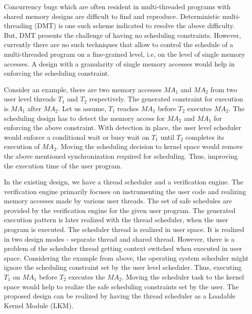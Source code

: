 Concurrency bugs which are often resident in multi-threaded programs with shared memory designs are difficult to find and reproduce. 
Deterministic multi-threading (DMT) is one such scheme indicated to resolve the above difficulty. 
But, DMT presents the challenge of having no scheduling constraints.  
However, currently there are no such techniques that allow to control the schedule of a multi-threaded program on a fine-grained level, i.e, on the level of single memory accesses. 
A design with a granularity of single memory accesses would help in enforcing the scheduling constraint. 

Consider an example, there are two memory accesses $MA_{1}$ and $MA_{2}$ from two user level threads $T_{1}$ and $T_{2}$ respectively. 
The generated constraint for execution is $MA_{1}$ after $MA_{2}$. 
Let us assume, $T_{1}$ reaches $MA_{1}$ before $T_{2}$ executes $MA_{2}$. 
The scheduling design has to detect the memory access for $MA_{2}$ and $MA_{1}$ for enforcing the above constraint. 
With detection in place, the user level scheduler would enforce a conditional wait or busy wait on $T_{1}$ until $T_{2}$ completes its execution of $MA_{2}$.  
Moving the scheduling decision to kernel space would remove the above mentioned synchronization required for scheduling. 
Thus, improving the execution time of the user program.


In the existing design, we have a thread scheduler and a verification engine.  
The verification engine primarily focuses on instrumenting the user code and realizing memory accesses made by various user threads. 
The set of safe schedules are provided by the verification engine for the given user program. 
The generated execution pattern is later realized with the thread scheduler, when the user program is executed. 
The scheduler thread is realized in user space. 
It is realized in two design modes - separate thread and shared thread. 
However, there is a problem of the scheduler thread getting context switched when executed in user space. 
Considering the example from above, the operating system scheduler might ignore the scheduling constraint set by the user level scheduler. 
Thus, executing $T_{1}$ on $MA_{1}$ before $T_{2}$ executes the $MA_{2}$. 
Moving the scheduler task to the kernel space would help to realize the safe scheduling constraints set by the user. 
The proposed design can be realized by having the thread scheduler as a Loadable Kernel Module (LKM). 

